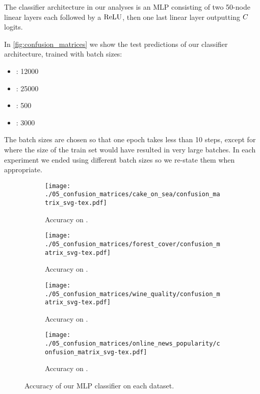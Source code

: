 \documentclass[../main.tex]{subfiles}
\begin{document}
The classifier architecture in our analyses is an MLP consisting of two 50-node linear layers each followed by a $\text{ReLU}$, then one last linear layer outputting $C$ logits.

In \autoref{fig:confusion_matrices} we show the test predictions of our classifier architecture, trained with batch sizes:
\begin{itemize}
    \item \CakeOnSea: 12000
    \item \ForestCover: 25000
    \item \WineQuality: 500
    \item \OnlineNewsPopularity: 3000
\end{itemize}
The batch sizes are chosen so that one epoch takes less than 10 steps, except for \ForestCover{} where the size of the train set would have resulted in very large batches.
In each experiment we ended using different batch sizes so we re-state them when appropriate.

\begin{figure}
    \centering
    \begin{subfigure}[b]{0.4\textwidth}
        \centering
\texttt{[image: ./05\_confusion\_matrices/cake\_on\_sea/confusion\_matrix\_svg-tex.pdf]}
        \caption{Accuracy on \CakeOnSea.}
\label{fig:cos_confusion_matrix}
    \end{subfigure}
    \begin{subfigure}[b]{0.4\textwidth}
        \centering
\texttt{[image: ./05\_confusion\_matrices/forest\_cover/confusion\_matrix\_svg-tex.pdf]}
        \caption{Accuracy on \ForestCover.}
    \end{subfigure}

    \begin{subfigure}[b]{0.4\textwidth}
        \centering
\texttt{[image: ./05\_confusion\_matrices/wine\_quality/confusion\_matrix\_svg-tex.pdf]}
        \caption{Accuracy on \WineQuality.}
    \end{subfigure}
    \begin{subfigure}[b]{0.4\textwidth}
        \centering
\texttt{[image: ./05\_confusion\_matrices/online\_news\_popularity/confusion\_matrix\_svg-tex.pdf]}
        \caption{Accuracy on \OnlineNewsPopularity.}
    \end{subfigure}

    \caption{Accuracy of our MLP classifier on each dataset.}
    \label{fig:confusion_matrices}
\end{figure}
\end{document}
